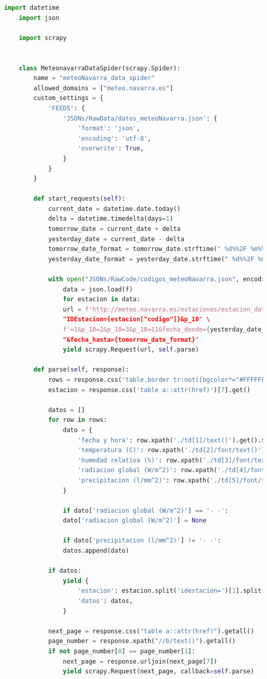 \begin{lstlisting}[language=Python, caption={MeteoNavarra Data Spider}]
	import datetime
	import json
	
	import scrapy
	
	
	class MeteonavarraDataSpider(scrapy.Spider):
		name = "meteoNavarra_data_spider"
		allowed_domains = ["meteo.navarra.es"]
		custom_settings = {
			'FEEDS': {
				'JSONs/RawData/datos_meteoNavarra.json': {
					'format': 'json',
					'encoding': 'utf-8',
					'overwrite': True,
				}
			}
		}
		
		def start_requests(self):
			current_date = datetime.date.today()
			delta = datetime.timedelta(days=1)
			tomorrow_date = current_date + delta
			yesterday_date = current_date - delta
			tomorrow_date_format = tomorrow_date.strftime(" %d%%2F %m%%2F%Y").replace(' 0', '')
			yesterday_date_format = yesterday_date.strftime(" %d%%2F %m%%2F%Y").replace(' 0', '')
			
			with open("JSONs/RawCode/codigos_meteoNavarra.json", encoding="utf-8") as f:
				data = json.load(f)
				for estacion in data:
				url = f'http://meteo.navarra.es/estaciones/estacion_datos_m.cfm?"
				"IDEstacion={estacion["codigo"]}&p_10' \
				f'=1&p_10=2&p_10=3&p_10=11&fecha_desde={yesterday_date_format}"
				"&fecha_hasta={tomorrow_date_format}'
				yield scrapy.Request(url, self.parse)
		
		def parse(self, response):
			rows = response.css('table.border tr:not([bgcolor*="#FFFFFF"])')
			estacion = response.css('table a::attr(href)')[7].get()
			
			datos = []
			for row in rows:
				dato = {
					'fecha y hora': row.xpath('./td[1]/text()').get().strip().replace(' ', ' ') + ':00',
					'temperatura (C)': row.xpath('./td[2]/font/text()').get(),
					'humedad relativa (%)': row.xpath('./td[3]/font/text()').get(),
					'radiacion global (W/m^2)': row.xpath('./td[4]/font/text()').get(),
					'precipitacion (l/mm^2)': row.xpath('./td[5]/font/text()').get(),
				}
				
				if dato['radiacion global (W/m^2)'] == '- -':
				dato['radiacion global (W/m^2)'] = None
				
				if dato['precipitacion (l/mm^2)'] != '- -':
				datos.append(dato)
			
			if datos:
				yield {
					'estacion': estacion.split('idestacion=')[1].split('&')[0],
					'datos': datos,
				}
			
			next_page = response.css("table a::attr(href)").getall()
			page_number = response.xpath("//b/text()").getall()
			if not page_number[0] == page_number[1]:
				next_page = response.urljoin(next_page[7])
				yield scrapy.Request(next_page, callback=self.parse)
\end{lstlisting}

